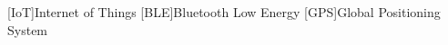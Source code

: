 \begin{acronym}[AAAAA]

    [IoT]{Internet of Things}
    [BLE]{Bluetooth Low Energy}
    [GPS]{Global Positioning System}
    
\end{acronym}